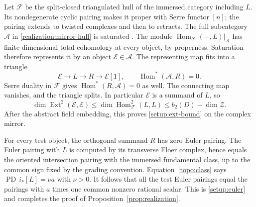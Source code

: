 \documentclass[11pt]{article}
\numberwithin{equation}{section}
\theoremstyle{definition}
\theoremstyle{remark}
\DeclareMathOperator{\Ext}{Ext}
\DeclareMathOperator{\Hom}{Hom}
\DeclareMathOperator{\PD}{PD}
\begin{document}
Let $\mathcal F$ be the split-closed triangulated hull of the immersed
category including $L$.  Its nondegenerate cyclic pairing makes it
proper with Serre functor $[n]$; the pairing extends to twisted complexes
and then to retracts.  The full subcategory $\mathcal A$ in
\eqref{realization:mirror-hull} is saturated
\cite{BondalVanDenBergh}.  The module
$\Hom_{\mathcal F}(-,L)|_{\mathcal A}$ has finite-dimensional total
cohomology at every object, by properness.  Saturation therefore
represents it by an object
$\mathcal E\in\mathcal A$.  The representing map fits into a triangle
\[
 \mathcal E\longrightarrow L\longrightarrow R\longrightarrow
 \mathcal E[1],
 \qquad \Hom^*(\mathcal A,R)=0.
\]
Serre duality in $\mathcal F$ gives
$\Hom^*(R,\mathcal A)=0$ as well.  The connecting map vanishes, and the
triangle splits.  In particular $\mathcal E$ is a summand of $L$, so
\[
 \dim\Ext^2(\mathcal E,\mathcal E)
 \le\dim\Hom^2_{\mathcal F}(L,L)
 \le b_2(D)-\dim\mathcal Z.
\]
After the abstract field embedding, this proves
\eqref{setup:ext-bound} on the complex mirror.

For every test object, the orthogonal summand $R$ has zero Euler
pairing.  The Euler pairing with $L$ is computed by its transverse
Floer complex, hence equals the oriented intersection pairing with
the immersed fundamental class, up to the common sign fixed by the
grading convention.  Equation~\eqref{topo:class} says
$\PD\,i_*[L]=\nu a$ with $\nu>0$.  It follows that all the test Euler
pairings equal the pairings with $a$ times one common nonzero rational
scalar.  This is \eqref{setup:euler} and completes the proof of
Proposition~\ref{prop:realization}.




\end{document}
